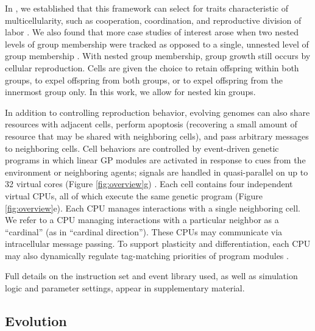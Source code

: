 In , we established that this framework can select for traits characteristic of multicellularity, such as cooperation, coordination, and reproductive division of labor .
We also found that more case studies of interest arose when two nested levels of group membership were tracked
as opposed to a single, unnested level of group membership .
With nested group membership, group growth still occurs by cellular reproduction.
Cells are given the choice to retain offspring within both groups, to expel offspring from both groups, or to expel offspring from the innermost group only.
In this work, we allow for nested kin groups.

In addition to controlling reproduction behavior, evolving genomes can also share resources with adjacent cells, perform apoptosis (recovering a small amount of resource that may be shared with neighboring cells), and pass arbitrary messages to neighboring cells.
Cell behaviors are controlled by event-driven genetic programs in which linear GP modules are activated in response to cues from the environment or neighboring agents; signals are handled in quasi-parallel on up to 32 virtual cores (Figure \ref{fig:overview}g) \citep{lalejini2018evolving}.
Each cell contains four independent virtual CPUs, all of which execute the same genetic program (Figure \ref{fig:overview}e).
Each CPU manages interactions with a single neighboring cell.
We refer to a CPU managing interactions with a particular neighbor as a ``cardinal'' (as in ``cardinal direction'').
These CPUs may communicate via intracellular message passing.
To support plasticity and differentiation, each CPU may also dynamically regulate tag-matching priorities of program modules \citep{lalejini2021tag}.

Full details on the instruction set and event library used, as well as simulation logic and parameter settings, appear in supplementary material.


\subsection{Evolution}
\label{sec:evolution;ch:measuring-cna}


